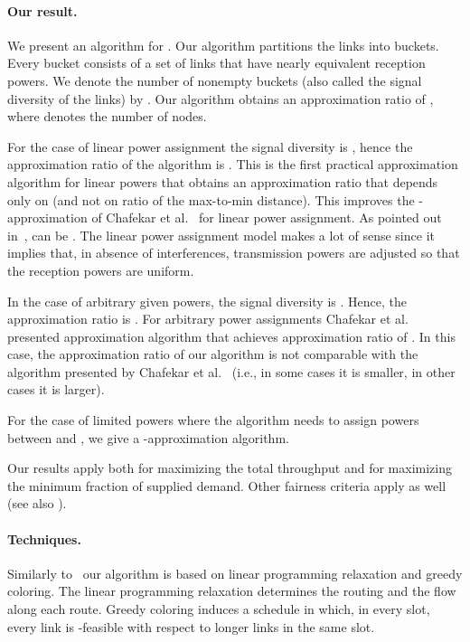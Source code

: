 \documentclass[11pt]{article}
\newenvironment{proof sketch}{\noindent {\bf Proof sketch:} }{\hfill \qed}
\newcommand{\sinr}{\text{\sc{sinr}}}
\newcommand{\throute}{\text{\sc throughput-route}}
\begin{document}
\paragraph{Our result.}
 We present an algorithm for
\throute.  Our algorithm partitions the links into buckets.  Every
bucket consists of a set of links that have nearly equivalent
reception powers.  We denote the number of nonempty buckets (also
called the signal diversity of the links) by .  Our algorithm
obtains an approximation ratio of , where 
denotes the number of nodes.

For the case of linear power assignment the signal diversity is
, hence the approximation ratio of the algorithm is
.  This is the first practical approximation
algorithm for linear powers that obtains an approximation ratio that
depends only on  (and not on ratio of the max-to-min distance).
This improves the -approximation of Chafekar et
al.~\cite{ChafekarCapacity} for linear power assignment.  As pointed
out in~\cite{goussevskaia2009capacity},  can be
.  The linear power assignment model makes a lot of sense
since it implies that, in absence of interferences, transmission
powers are adjusted so that the reception powers are uniform.

In the case of arbitrary given powers, the signal diversity is
.  Hence, the approximation
ratio is .  For arbitrary
power assignments Chafekar et al.~\cite{ChafekarCapacity} presented
approximation algorithm that achieves approximation ratio of .  In this case, the approximation ratio of
our algorithm is not comparable with the algorithm presented by
Chafekar et al.~\cite{ChafekarCapacity} (i.e., in some cases it is
smaller, in other cases it is larger).


For the case of limited powers where the algorithm needs to assign
powers between  and , we give a -approximation algorithm.

Our results apply both for maximizing the total throughput and for
maximizing the minimum fraction of supplied demand. Other fairness
criteria apply as well (see also \cite{ChafekarPhD}).


\paragraph{Techniques.}
Similarly to~\cite{ChafekarCapacity} our algorithm is based on linear
programming relaxation and greedy coloring.
The linear programming relaxation determines the routing and the flow along each route.
Greedy coloring induces a schedule in which, in every slot, every link is \sinr-feasible with respect to longer links in the same slot.
\end{document}
